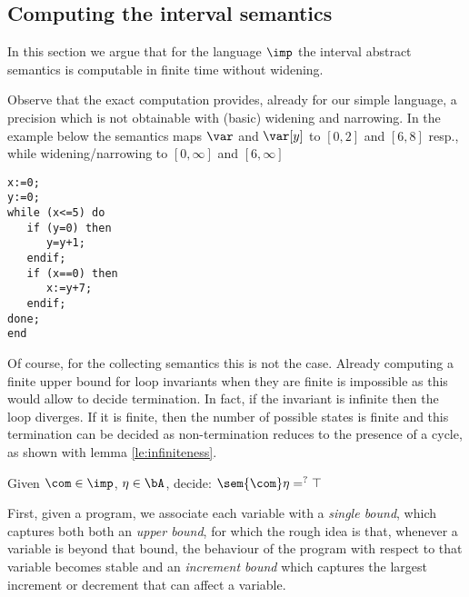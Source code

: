 \subsection{Computing the interval semantics} 

In this section we argue that for the language \(\imp\) the interval
abstract semantics is computable in finite time without widening.

Observe that the exact computation provides, already for our simple
language, a precision which is not obtainable with (basic) widening
and narrowing. In the example below the semantics maps \(\var\) and
\(\var[y]\) to \([0,2]\) and \([6,8]\) resp., while widening/narrowing
to \([0,\infty]\) and \([6,\infty]\)

\begin{verbatim}
x:=0;
y:=0;
while (x<=5) do
   if (y=0) then
      y=y+1;
   endif;
   if (x==0) then
      x:=y+7;
   endif;
done;
end
\end{verbatim}

Of course, for the collecting semantics this is not the case. Already
computing a finite upper bound for loop invariants when they are
finite is impossible as this would allow to decide termination. In
fact, if the invariant is infinite then the loop diverges. If it is
finite, then the number of possible states is finite and this
termination can be decided as non-termination reduces to the presence
of a cycle, as shown with lemma \ref{le:infiniteness}.

\begin{problem}\label{problem1}
Given \(\com\in \imp\), \(\eta \in \bA\), decide: \(\sem{\com} \eta
=^? \top\)
\end{problem}

First, given a program, we associate each variable with a \emph{single
bound}, which captures both both an \emph{upper bound}, for which the
rough idea is that, whenever a variable is beyond that bound, the
behaviour of the program with respect to that variable becomes stable
and an \emph{increment bound} which captures the largest increment or
decrement that can affect a variable.

